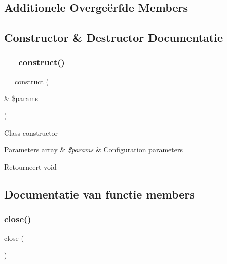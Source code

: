 \subsection*{Additionele Overge\"{e}rfde Members}


\subsection{Constructor \& Destructor Documentatie}
\mbox{\label{class_c_i___session__files__driver_ac1669c73d53d6f16cf5459a1e84d39c8}} 
\subsubsection{\texorpdfstring{\_\_construct()}{\_\_construct()}}
{\footnotesize\ttfamily \+\_\+\+\_\+construct (\begin{DoxyParamCaption}\item[{\&}]{\$params }\end{DoxyParamCaption})}

Class constructor


\begin{DoxyParams}[1]{Parameters}
array & {\em \$params} & Configuration parameters \\
\hline
\end{DoxyParams}
\begin{DoxyReturn}{Retourneert}
void 
\end{DoxyReturn}


\subsection{Documentatie van functie members}
\mbox{\label{class_c_i___session__files__driver_aa69c8bf1f1dcf4e72552efff1fe3e87e}} 
\subsubsection{\texorpdfstring{close()}{close()}}
{\footnotesize\ttfamily close (\begin{DoxyParamCaption}{ }\end{DoxyParamCaption})}

